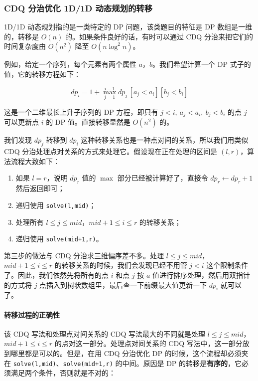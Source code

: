 \hrulefill

\subsubsection*{CDQ 分治优化 1D/1D 动态规划的转移}

1D/1D 动态规划指的是一类特定的 DP 问题，该类题目的特征是 DP 数组是一维的，转移是 $O(n)$ 的。如果条件良好的话，有时可以通过 CDQ 分治来把它们的时间复杂度由 $O(n^2)$ 降至 $O(n\log^2 n)$。

例如，给定一个序列，每个元素有两个属性 $a$，$b$。我们希望计算一个 DP 式子的值，它的转移方程如下：

$$dp_i = 1 + \max_{j=1}^{i-1} dp_j\,[a_j < a_i][b_j < b_i]$$

这是一个二维最长上升子序列的 DP 方程，即只有 $j < i,\ a_j < a_i,\ b_j < b_i$ 的点 $j$ 可以更新点 $i$ 的 DP 值。直接转移显然是 $O(n^2)$ 的。

我们发现 $dp_j$ 转移到 $dp_i$ 这种转移关系也是一种点对间的关系，所以我们用类似 CDQ 分治处理点对关系的方式来处理它。假设现在正在处理的区间是 $(l,r)$，算法流程大致如下：

\begin{enumerate}
    \item 如果 $l=r$，说明 $dp_r$ 值的 $\max$ 部分已经被计算好了，直接令 $dp_r \gets dp_r + 1$ 然后返回即可；
    \item 递归使用 \texttt{solve(l,mid)}；
    \item 处理所有 $l \le j \le mid$，$mid+1 \le i \le r$ 的转移关系；
    \item 递归使用 \texttt{solve(mid+1,r)}。
\end{enumerate}

第三步的做法与 CDQ 分治求三维偏序差不多。处理 $l \le j \le mid$，$mid+1 \le i \le r$ 的转移关系的时候，我们会发现已经不用管 $j < i$ 这个限制条件了。因此，我们依然先将所有的点 $i$ 和点 $j$ 按 $a$ 值进行排序处理，然后用双指针的方式将 $j$ 点插入到树状数组里，最后查一下前缀最大值更新一下 $dp_i$ 就可以了。

\paragraph{转移过程的正确性}
该 CDQ 写法和处理点对间关系的 CDQ 写法最大的不同就是处理 $l \le j \le mid$，$mid+1 \le i \le r$ 的点对这一部分。处理点对间关系的 CDQ 写法中，这一部分放到哪里都是可以的。但是，在用 CDQ 分治优化 DP 的时候，这个流程却必须夹在 \texttt{solve(l,mid)}、\texttt{solve(mid+1,r)} 的中间。原因是 DP 的转移是\textbf{有序的}，它必须满足两个条件，否则就是不对的：

